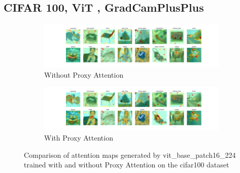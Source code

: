 \subsection{CIFAR 100, ViT , GradCamPlusPlus}
% 
\begin{figure}[H]
        \begin{subfigure}[b]{1\textwidth}
            \includegraphics[width=\linewidth]{images/cifar100_vit_base_patch16_224_noproxy_0.pdf}
            \caption{Without Proxy Attention}
        \end{subfigure}
        \begin{subfigure}[b]{1\textwidth}
            \includegraphics[width=\linewidth]{images/cifar100_vit_base_patch16_224_proxy_0.pdf}
            \caption{With Proxy Attention}
        \end{subfigure}
        \caption{Comparison of attention maps generated by vit\_base\_patch16\_224 trained with and without Proxy Attention on the cifar100 dataset}
    \end{figure}
    


